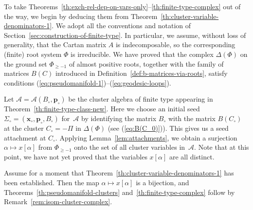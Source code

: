 \documentclass[letterpaper]{amsart}
\numberwithin{equation}{section}
\theoremstyle{definition}
\newcommand{\credit}[1]{\smallskip\noindent {\textbf{#1.\ }}}
\def\AA{\mathcal{A}}
\def\xx{\mathbf{x}}
\def\pp{\mathbf{p}}
\begin{document}
\credit{Proof of 
  Theorems~\ref{th:exch-rel-dep-on-vars-only}--\ref{th:finite-type-complex} 
modulo Theorem~\ref{th:cluster-variable-denominators-1}} 
To take 
Theorems~\ref{th:exch-rel-dep-on-vars-only}--\ref{th:finite-type-complex} 
out of the way, we begin by deducing 
them from Theorem~\ref{th:cluster-variable-denominators-1}. 
We adopt all the conventions and notation of 
Section~\ref{sec:construction-of-finite-type}. 
In particular, we assume, without loss of generality, 
that the Cartan matrix $A$ is indecomposable, so the corresponding 
(finite) root system $\Phi$ is irreducible. 
We have proved that the complex $\Delta (\Phi)$ on the ground set 
$\Phi_{\geq -1}$ of almost positive roots, together with the 
family of matrices $B(C)$ introduced in 
Definition~\ref{def:b-matrices-via-roots}, satisfy conditions 
(\ref{eq:pseudomanifold-1})--(\ref{eq:geodesic-loops}). 
 
 
Let $\AA=\AA(B_\circ,\pp_\circ)$ be the 
cluster algebra of finite type appearing in 
Theorem~\ref{th:finite-type-class-new}. 
Here we choose an initial seed $\Sigma_\circ=(\xx_\circ,\pp_\circ,B_\circ)$ 
for~$\AA$ by identifying the matrix $B_\circ$ 
with the matrix $B(C_\circ)$ at the cluster $C_\circ=-\Pi$ in 
$\Delta(\Phi)$ (see (\ref{eq:B(C_0)})). 
This gives us a seed attachment at $C_\circ$. 
Applying Lemma~\ref{lem:attachments}, we obtain a surjection $\alpha 
\mapsto x[\alpha]$ from $\Phi_{\geq -1}$ onto the set of all cluster 
variables in~$\AA$. 
Note that at this point, we have not yet proved that the variables 
$x[\alpha]$ are all distinct. 
 
 
Assume for a moment that 
Theorem~\ref{th:cluster-variable-denominators-1} has been 
established. 
Then the map $\alpha \mapsto x[\alpha]$ is a bijection, 
and Theorems~\ref{th:pseudomanifold-clusters} and~\ref{th:finite-type-complex} 
follow by Remark~\ref{rem:isom-cluster-complex}. 
 
\end{document}
